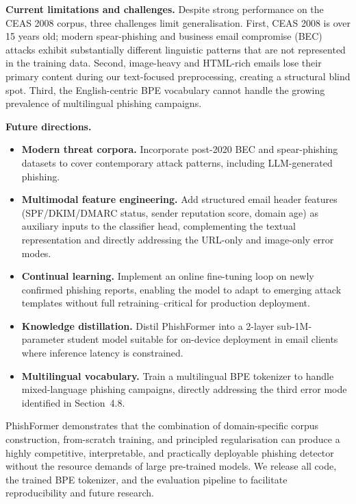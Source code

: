 \documentclass[sigconf, nonacm]{acmart}
\begin{document}
\textbf{Current limitations and challenges.}
Despite strong performance on the CEAS 2008 corpus, three challenges
limit generalisation.
First, CEAS 2008 is over 15 years old; modern spear-phishing and
business email compromise (BEC) attacks exhibit substantially
different linguistic patterns that are not represented in the training
data.
Second, image-heavy and HTML-rich emails lose their primary content
during our text-focused preprocessing, creating a structural blind
spot.
Third, the English-centric BPE vocabulary cannot handle
the growing prevalence of multilingual phishing campaigns.

\textbf{Future directions.}
\begin{itemize}[leftmargin=*,noitemsep,topsep=2pt]
  \item \textbf{Modern threat corpora.}
    Incorporate post-2020 BEC and spear-phishing datasets to cover
    contemporary attack patterns, including LLM-generated phishing.
  \item \textbf{Multimodal feature engineering.}
    Add structured email header features (SPF/DKIM/DMARC status,
    sender reputation score, domain age) as auxiliary inputs to the
    classifier head, complementing the textual representation and
    directly addressing the URL-only and image-only error modes.
  \item \textbf{Continual learning.}
    Implement an online fine-tuning loop on newly confirmed phishing
    reports, enabling the model to adapt to emerging attack templates
    without full retraining--critical for production deployment.
  \item \textbf{Knowledge distillation.}
    Distil PhishFormer into a 2-layer sub-1M-parameter student model
    suitable for on-device deployment in email clients where inference
    latency is constrained.
  \item \textbf{Multilingual vocabulary.}
    Train a multilingual BPE tokenizer to handle mixed-language
    phishing campaigns, directly addressing the third error mode
    identified in Section~4.8.
\end{itemize}

PhishFormer demonstrates that the combination of domain-specific
corpus construction, from-scratch training, and principled
regularisation can produce a highly competitive, interpretable, and
practically deployable phishing detector without the resource demands
of large pre-trained models.
We release all code, the trained BPE tokenizer, and the evaluation
pipeline to facilitate reproducibility and future research.
\end{document}
